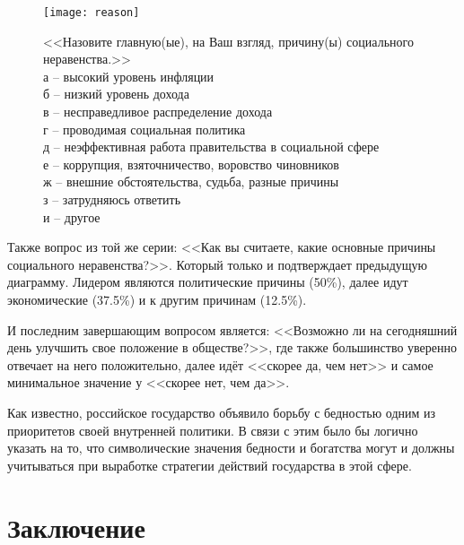 \begin{figure}[H]
    \centering
    \texttt{[image: reason]} \\
    \caption{<<Назовите главную(ые), на Ваш взгляд, причину(ы) социального 
        неравенства.>> \\
        а -- высокий уровень инфляции \\
        б -- низкий уровень дохода \\
        в -- несправедливое распределение дохода \\
        г -- проводимая социальная политика \\
        д -- неэффективная работа правительства в социальной сфере \\
        е -- коррупция, взяточничество, воровство чиновников \\
        ж -- внешние обстоятельства, судьба, разные причины \\
        з -- затрудняюсь ответить \\
        и -- другое
    }
\end{figure}

Также вопрос из той же серии: <<Как вы считаете, какие основные причины 
социального неравенства?>>. Который только и подтверждает предыдущую диаграмму.
Лидером являются политические причины (50\%), далее идут экономические 
(37.5\%) и к другим причинам (12.5\%).

И последним завершающим вопросом является: <<Возможно ли на сегодняшний день 
улучшить свое положение в обществе?>>, где также большинство уверенно отвечает 
на него положительно, далее идёт <<скорее да, чем нет>> и самое минимальное 
значение у <<скорее нет, чем да>>.

Как известно, российское государство объявило борьбу с бедностью одним из 
приоритетов своей внутренней политики. В связи с этим было бы логично указать 
на то, что символические значения бедности и богатства могут и должны 
учитываться при выработке стратегии действий государства в этой сфере.

\newpage

\section*{Заключение}

